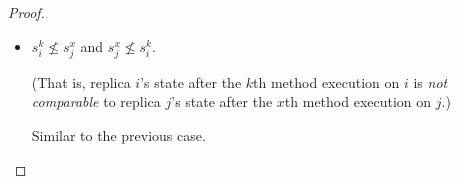 \begin{proof}
\begin{itemize}
  \item $s^k_i \nleq s^x_j$ and $s^x_j \nleq s^k_i$.

    (That is, replica $i$'s state after the $k$th method execution on $i$
    is \emph{not comparable} to replica $j$'s state after the $x$th method
    execution on $j$.)

    Similar to the previous case.
  \end{itemize}
\end{proof}
